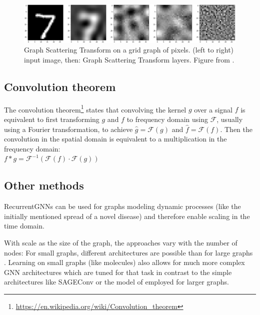 \documentclass{article}
\begin{document}
\begin{figure}[ht]
	\vskip 0.2in
	\begin{center}
		\centerline{\includegraphics[width=\columnwidth]{scatteringresult}}
		\caption{Graph Scattering Transform on a grid graph of pixels. (left to right) input image, then: Graph Scattering Transform layers. Figure from \cite{zou2019graph}.}
		\label{fig:scatteringresult}
	\end{center}
	\vskip -0.2in
\end{figure}
\subsection{Convolution theorem}
\label{sec:convtheorem}
The convolution theorem\footnote{\href{https://en.wikipedia.org/wiki/Convolution_theorem}{https://en.wikipedia.org/wiki/Convolution\_theorem}} states that convolving the kernel $g$ over a signal $f$ is equivalent to first transforming $g$ and $f$ to frequency domain using $\mathcal{F}$, usually using a Fourier transformation, to achieve $\hat{g}=\mathcal{F}(g)$ and $\hat{f}=\mathcal{F}(f)$. Then the convolution in the spatial domain is equivalent to a multiplication in the frequency domain: \\ $f * g = \mathcal{F}^{-1}(\mathcal{F}(f)\cdot \mathcal{F}(g))$ %


\subsection{Other methods}
\label{sec:other}
RecurrentGNNs \cite{ruiz2020gated} can be used for graphs modeling dynamic processes (like the initially mentioned spread of a novel disease) and therefore enable scaling in the time domain.

With scale as the size of the graph, the approaches vary with the number of nodes: For small graphs, different architectures are possible than for large graphs \cite{simonovsky2018graphvae,hamilton2017inductive}.
Learning on small graphs (like molecules) also allows for much more complex GNN architectures which are tuned for that task \cite{klicpera2020directional} in contrast to the simple architectures like SAGEConv or the model of \citet{wu2019simplifying} employed for larger graphs.



\end{document}
